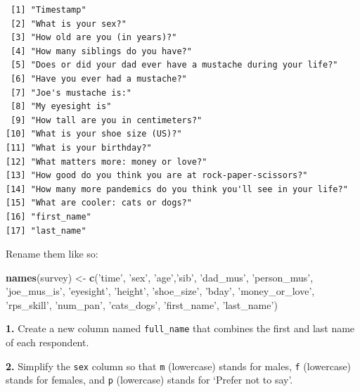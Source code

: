 \documentclass[]{book}
\newenvironment{Shaded}{\begin{snugshade}}{\end{snugshade}}
\newcommand{\KeywordTok}[1]{\textcolor[rgb]{0.13,0.29,0.53}{\textbf{#1}}}
\newcommand{\NormalTok}[1]{#1}
\newcommand{\StringTok}[1]{\textcolor[rgb]{0.31,0.60,0.02}{#1}}
\begin{document}
\begin{verbatim}
 [1] "Timestamp"                                                    
 [2] "What is your sex?"                                            
 [3] "How old are you (in years)?"                                  
 [4] "How many siblings do you have?"                               
 [5] "Does or did your dad ever have a mustache during your life?"  
 [6] "Have you ever had a mustache?"                                
 [7] "Joe's mustache is:"                                           
 [8] "My eyesight is"                                               
 [9] "How tall are you in centimeters?"                             
[10] "What is your shoe size (US)?"                                 
[11] "What is your birthday?"                                       
[12] "What matters more: money or love?"                            
[13] "How good do you think you are at rock-paper-scissors?"        
[14] "How many more pandemics do you think you'll see in your life?"
[15] "What are cooler: cats or dogs?"                               
[16] "first_name"                                                   
[17] "last_name"                                                    
\end{verbatim}

Rename them like so:

\begin{Shaded}
\begin{Highlighting}[]
\KeywordTok{names}\NormalTok{(survey) <-}\StringTok{ }\KeywordTok{c}\NormalTok{(}\StringTok{'time'}\NormalTok{, }\StringTok{'sex'}\NormalTok{, }\StringTok{'age'}\NormalTok{,}\StringTok{'sib'}\NormalTok{, }\StringTok{'dad_mus'}\NormalTok{, }
                   \StringTok{'person_mus'}\NormalTok{, }\StringTok{'joe_mus_is'}\NormalTok{, }\StringTok{'eyesight'}\NormalTok{, }
                   \StringTok{'height'}\NormalTok{, }\StringTok{'shoe_size'}\NormalTok{, }\StringTok{'bday'}\NormalTok{, }\StringTok{'money_or_love'}\NormalTok{, }
                   \StringTok{'rps_skill'}\NormalTok{, }\StringTok{'num_pan'}\NormalTok{, }\StringTok{'cats_dogs'}\NormalTok{, }
                   \StringTok{'first_name'}\NormalTok{, }\StringTok{'last_name'}\NormalTok{)}
\end{Highlighting}
\end{Shaded}

\textbf{1.} Create a new column named \texttt{full\_name} that combines the first and last name of each respondent.

\textbf{2.} Simplify the \texttt{sex} column so that \texttt{m} (lowercase) stands for males, \texttt{f} (lowercase) stands for females, and \texttt{p} (lowercase) stands for `Prefer not to say'.
\end{document}
